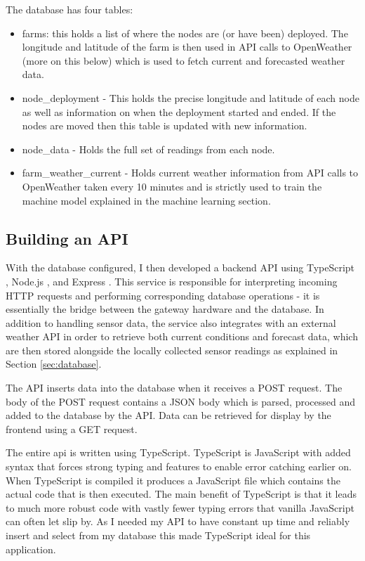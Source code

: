The database has four tables:

\begin{itemize}     
      \item farms: this holds a list of where the nodes are (or have been)
      deployed. The longitude and latitude of the farm is then used in API calls
      to OpenWeather (more on this below) which is used to fetch current and
      forecasted weather data.
      \item node\_deployment - This holds the precise longitude and latitude of
      each node as well as information on when the deployment started and ended.
      If the nodes are moved then this table is updated with new information.     
      \item node\_data - Holds the full set of readings from each node.    
      \item farm\_weather\_current - Holds current weather information from API
      calls to OpenWeather taken every 10 minutes and is strictly used to train
      the machine model explained in the machine learning section.
 \end{itemize} 


\subsection{Building an API}\label{sec:building-api}

With the database configured, I then developed a backend API using TypeScript
\cite{typescript}, Node.js \cite{nodejs}, and Express \cite{express}. This
service is responsible for interpreting incoming HTTP requests and performing
corresponding database operations - it is essentially the bridge between the
gateway hardware and the database. In addition to handling sensor data, the
service also integrates with an external weather API in order to retrieve both
current conditions and forecast data, which are then stored alongside the
locally collected sensor readings as explained in Section \ref{sec:database}.

The API inserts data into the database when it receives a POST request. The body
of the POST request contains a JSON body which is parsed, processed and added to
the database by the API. Data can be retrieved for display by the frontend using
a GET request.

The entire api is written using TypeScript. TypeScript is JavaScript with added
syntax that forces strong typing and features to enable error catching earlier
on. When TypeScript is compiled it produces a JavaScript file which contains the
actual code that is then executed. The main benefit of TypeScript is that it
leads to much more robust code with vastly fewer typing errors that vanilla
JavaScript can often let slip by. As I needed my API to have constant up time
and reliably insert and select from my database this made TypeScript ideal for
this application.

